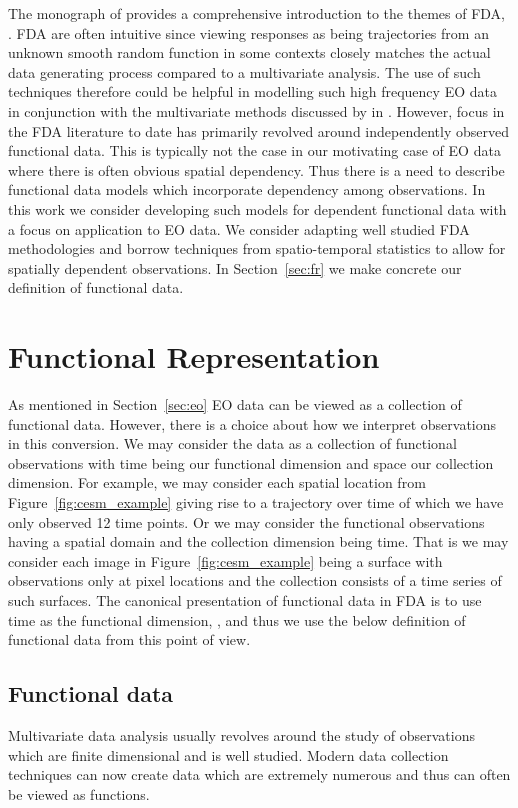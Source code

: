 The monograph of \citeauthor{ramsay_functional_2010} provides a comprehensive introduction to the themes of FDA, \citep{ramsay_functional_2010}.
FDA are often intuitive since viewing responses as being trajectories from an unknown smooth random function in some contexts closely matches the actual data generating process compared to a multivariate analysis.
The use of such techniques therefore could be helpful in modelling such high frequency EO data in conjunction with the multivariate methods discussed by \citeauthor{cressie_statistics_2011} in \citep{cressie_statistics_2011}.
However, focus in the FDA literature to date has primarily revolved around independently observed functional data.
This is typically not the case in our motivating case of EO data where there is often obvious spatial dependency.
Thus there is a need to describe functional data models which incorporate dependency among observations.
In this work we consider developing such models for dependent functional data with a focus on application to EO data.
We consider adapting well studied FDA methodologies and borrow techniques from spatio-temporal statistics to allow for spatially dependent observations.
In Section~\ref{sec:fr} we make concrete our definition of functional data. 

\section{Functional Representation \label{sec:fr}}
As mentioned in Section~\ref{sec:eo} EO data can be viewed as a collection of functional data.
However, there is a choice about how we interpret observations in this conversion.
We may consider the data as a collection of functional observations with time being our functional dimension and space our collection dimension.
For example, we may consider each spatial location from Figure~\ref{fig:cesm_example} giving rise to a trajectory over time of which we have only observed 12 time points.
Or we may consider the functional observations having a spatial domain and the collection dimension being time.
That is we may consider each image in Figure~\ref{fig:cesm_example} being a surface with observations only at pixel locations and the collection consists of a time series of such surfaces. 
The canonical presentation of functional data in FDA is to use time as the functional dimension, \citep{ramsay_functional_2010}, and thus we use the below definition of functional data from this point of view. 

\subsection{Functional data \label{ssec:fd}}
Multivariate data analysis usually revolves around the study of observations which are finite dimensional and is well studied.
Modern data collection techniques can now create data which are extremely numerous and thus can often be viewed as functions.


